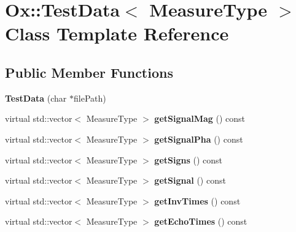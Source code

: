\hypertarget{class_ox_1_1_test_data}{\section{Ox\-:\-:Test\-Data$<$ Measure\-Type $>$ Class Template Reference}
\label{class_ox_1_1_test_data}
}
\subsection*{Public Member Functions}
\begin{DoxyCompactItemize}
\item 
\hypertarget{class_ox_1_1_test_data_add19d13b8ec2404fc5d6ebf4ee79a231}{{\bfseries Test\-Data} (char $\ast$file\-Path)}\label{class_ox_1_1_test_data_add19d13b8ec2404fc5d6ebf4ee79a231}

\item 
\hypertarget{class_ox_1_1_test_data_a4e75699c035937ff96fa131505870208}{virtual std\-::vector$<$ Measure\-Type $>$ {\bfseries get\-Signal\-Mag} () const }\label{class_ox_1_1_test_data_a4e75699c035937ff96fa131505870208}

\item 
\hypertarget{class_ox_1_1_test_data_a287f28ddb03f9acc694528441b57c375}{virtual std\-::vector$<$ Measure\-Type $>$ {\bfseries get\-Signal\-Pha} () const }\label{class_ox_1_1_test_data_a287f28ddb03f9acc694528441b57c375}

\item 
\hypertarget{class_ox_1_1_test_data_a414b631b105104920740e51dcc4a3948}{virtual std\-::vector$<$ Measure\-Type $>$ {\bfseries get\-Signs} () const }\label{class_ox_1_1_test_data_a414b631b105104920740e51dcc4a3948}

\item 
\hypertarget{class_ox_1_1_test_data_a0dafaca55a2c3d57ff2106b518b3fada}{virtual std\-::vector$<$ Measure\-Type $>$ {\bfseries get\-Signal} () const }\label{class_ox_1_1_test_data_a0dafaca55a2c3d57ff2106b518b3fada}

\item 
\hypertarget{class_ox_1_1_test_data_acec1269baa03bfa45845f94f3bc15abe}{virtual std\-::vector$<$ Measure\-Type $>$ {\bfseries get\-Inv\-Times} () const }\label{class_ox_1_1_test_data_acec1269baa03bfa45845f94f3bc15abe}

\item 
\hypertarget{class_ox_1_1_test_data_a9fbce0afea939f1f0533bb2b325242a6}{virtual std\-::vector$<$ Measure\-Type $>$ {\bfseries get\-Echo\-Times} () const }\label{class_ox_1_1_test_data_a9fbce0afea939f1f0533bb2b325242a6}


\end{DoxyCompactItemize}
